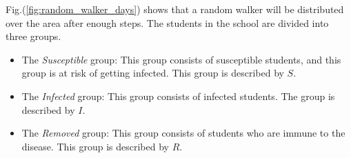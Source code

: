 \documentclass[%
twoside,                 %
final,                   %
chapterprefix=true,      %
open=right               %
10pt]{book}
\begin{document}
Fig.(\ref{fig:random_walker_days}) shows that a random walker will be distributed over the area after enough steps. The students in the school are divided into three groups. 
\begin{itemize}
\item The \emph{Susceptible} group: This group consists of susceptible students, and this group is at risk of getting infected. This group is described by $S$. 

\item The \emph{Infected} group: This group consists of infected students. The group is described by $I$. 

\item The \emph{Removed} group: This group consists of students who are immune to the disease. This group is described by $R$. 
\end{itemize}
\end{document}
